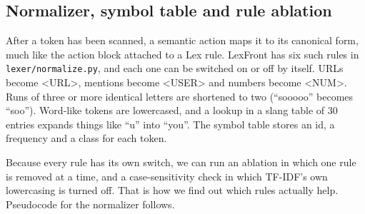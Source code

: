 \documentclass[journal,a4paper]{IEEEtran}
\begin{document}
\subsection{Normalizer, symbol table and rule ablation}\label{sec:3.5}
After a token has been scanned, a semantic action maps it to its canonical form, much like the action block attached to a Lex rule. LexFront has six such rules in \texttt{lexer/\allowbreak{}normalize.py}, and each one can be switched on or off by itself. URLs become \textless{}URL\textgreater{}, mentions become \textless{}USER\textgreater{} and numbers become \textless{}NUM\textgreater{}. Runs of three or more identical letters are shortened to two (``sooooo'' becomes ``soo''). Word-like tokens are lowercased, and a lookup in a slang table of 30 entries expands things like ``u'' into ``you''. The symbol table stores an id, a frequency and a class for each token.

Because every rule has its own switch, we can run an ablation in which one rule is removed at a time, and a case-sensitivity check in which TF-IDF's own lowercasing is turned off. That is how we find out which rules actually help. Pseudocode for the normalizer follows.
\end{document}
